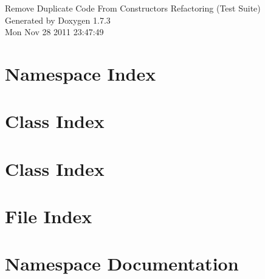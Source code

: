 \documentclass[a4paper]{book}
\begin{document}
\hypersetup{pageanchor=false}
\begin{titlepage}
\vspace*{7cm}
\begin{center}
{\Large Remove Duplicate Code From Constructors Refactoring (Test Suite) }\\
\vspace*{1cm}
{\large Generated by Doxygen 1.7.3}\\
\vspace*{0.5cm}
{\small Mon Nov 28 2011 23:47:49}\\
\end{center}
\end{titlepage}
\clearemptydoublepage
{}
\tableofcontents
\clearemptydoublepage
{}
\hypersetup{pageanchor=true}
\chapter{Namespace Index}

\chapter{Class Index}

\chapter{Class Index}

\chapter{File Index}

\chapter{Namespace Documentation}











\end{document}
